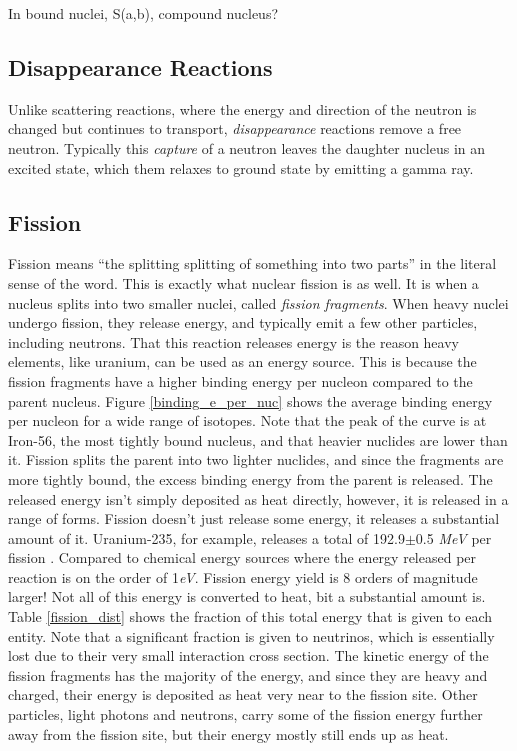 In bound nuclei, S(a,b),  compound nucleus?

\subsection{Disappearance Reactions}

Unlike scattering reactions, where the energy and direction of the neutron is changed but continues to transport, \emph{disappearance} reactions remove a free neutron.  Typically this \emph{capture} of a neutron leaves the daughter nucleus in an excited state, which them relaxes to ground state by emitting a gamma ray.


\subsection{Fission}

Fission means ``the splitting splitting of something into two parts'' in the literal sense of the word.  This is exactly what nuclear fission is as well.  It is when a nucleus splits into two smaller nuclei, called \emph{fission fragments}.  When heavy nuclei undergo fission, they release energy, and typically emit a few other particles, including neutrons.  That this reaction releases energy is the reason heavy elements, like uranium, can be used as an energy source.  This is because the fission fragments have a higher binding energy per nucleon compared to the parent nucleus.  Figure \ref{binding_e_per_nuc} shows the average binding energy per nucleon for a wide range of isotopes.  Note that the peak of the curve is at Iron-56, the most tightly bound nucleus, and that heavier nuclides are lower than it.  Fission splits the parent into two lighter nuclides, and since the fragments are more tightly bound, the excess binding energy from the parent is released.  The released energy isn't simply deposited as heat directly, however, it is released in a range of forms.  Fission doesn't just release some energy, it releases a substantial amount of it.  Uranium-235, for example, releases a total of 192.9$\pm$0.5 \emph{MeV} per fission \cite{duderstadt}.  Compared to chemical energy sources where the energy released per reaction is on the order of 1\emph{eV}.  Fission energy yield is 8 orders of magnitude larger!  Not all of this energy is converted to heat, bit a substantial amount is.  Table \ref{fission_dist} shows the fraction of this total energy that is given to each entity.  Note that a significant fraction is given to neutrinos, which is essentially lost due to their very small interaction cross section.  The kinetic energy of the fission fragments has the majority of the energy, and since they are heavy and charged, their energy is deposited as heat very near to the fission site.  Other particles, light photons and neutrons, carry some of the fission energy further away from the fission site, but their energy mostly still ends up as heat.
  

